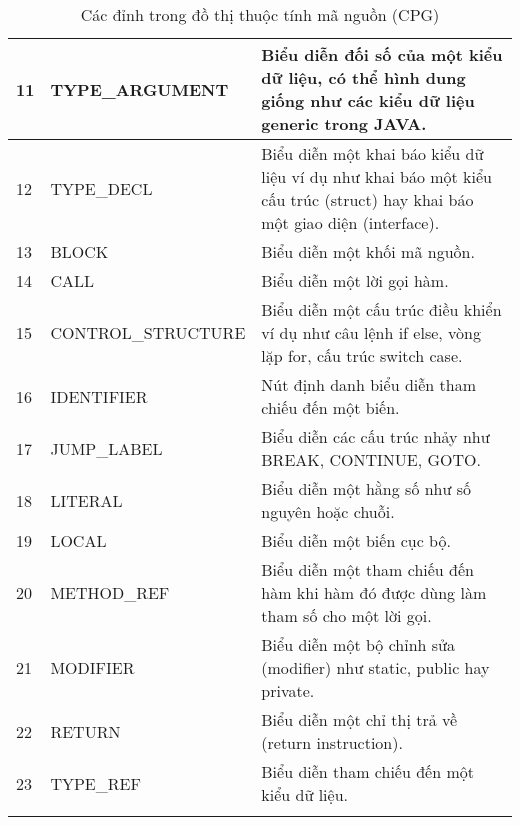 \begin{longtable}{| p{} | p{} | p{} |}
11  & TYPE\_ARGUMENT     & Biểu diễn đối số của một kiểu dữ liệu, có thể hình dung giống như các kiểu dữ liệu generic trong JAVA.                                                          \\ \hline
12  & TYPE\_DECL         & Biểu diễn một khai báo kiểu dữ liệu ví dụ như khai báo một kiểu cấu trúc (struct) hay khai báo một giao diện (interface).                                       \\ \hline
13  & BLOCK             & Biểu diễn một khối mã nguồn.                                                                                                                                    \\ \hline
14  & CALL              & Biểu diễn một lời gọi hàm.                                                                                                                                      \\ \hline
15  & CONTROL\_STRUCTURE & Biểu diễn một cấu trúc điều khiển ví dụ như câu lệnh if else, vòng lặp for, cấu trúc switch case.                                                               \\ \hline
16  & IDENTIFIER        & Nút định danh biểu diễn tham chiếu đến một biến.                                                                                                                \\ \hline
17  & JUMP\_LABEL        & Biểu diễn các cấu trúc nhảy như BREAK, CONTINUE, GOTO.                                                                                                          \\ \hline
18  & LITERAL           & Biểu diễn một hằng số như số nguyên hoặc chuỗi.                                                                                                                 \\ \hline
19  & LOCAL             & Biểu diễn một biến cục bộ.                                                                                                                                      \\ \hline
20  & METHOD\_REF        & Biểu diễn một tham chiếu đến hàm khi hàm đó được dùng làm tham số cho một lời gọi.                                                                              \\ \hline
21  & MODIFIER          & Biểu diễn một bộ chỉnh sửa (modifier) như static, public hay private.                                                                                           \\ \hline
22  & RETURN            & Biểu diễn một chỉ thị trả về (return instruction).                                                                                                              \\ \hline
23  & TYPE\_REF          & Biểu diễn tham chiếu đến một kiểu dữ liệu.                                                                                                                      \\ \hline
\caption{Các đỉnh trong đồ thị thuộc tính mã nguồn (CPG)}
\label{table:c3_nodecpgjoern}
\end{longtable}
\medskip

